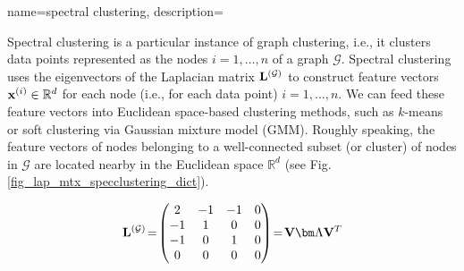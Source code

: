 {name={spectral clustering},
	description={Spectral clustering is a particular instance of 
		graph clustering, i.e., it clusters data points 
		represented as the nodes $i=1,\ldots,n$ of a graph $\mathcal{G}$. 
		Spectral clustering uses the eigenvectors of the Laplacian matrix ${\bf L}^{(\mathcal{G})}$ 
		to construct feature vectors ${\bf x}^{(i)} \in \mathbb{R}^{d}$ 
		for each node (i.e., for each data point) $i=1,\ldots,n$. We can feed these feature vectors 
		into Euclidean space-based clustering methods, such as $k$-means 
		or soft clustering via Gaussian mixture model (GMM). Roughly speaking, the feature vectors of nodes 
		belonging to a well-connected subset (or cluster) of nodes in $\mathcal{G}$ are located 
		nearby in the Euclidean space $\mathbb{R}^{d}$ (see Fig. \ref{fig_lap_mtx_specclustering_dict}). 
		\begin{figure}[H]
			\begin{center}
				\begin{minipage}{0.4\textwidth}
				\end{minipage} 
				\hspace*{5mm}
				\begin{minipage}{0.4\textwidth}
					\begin{equation} 
						{\bf L}^{(\mathcal{G})}\!=\!
						\begin{pmatrix} 
							2 & -1 & -1 & 0 \\ 
							-1 & 1 & 0 & 0 \\  
							-1 & 0 & 1 & 0 \\ 
							0 & 0 & 0 & 0 
						\end{pmatrix}\!=\!\mathbf{V} {\bm \Lambda} \mathbf{V}^{T}  
						\nonumber

\end{equation}
\end{minipage}
\end{center}
\end{figure}}}
